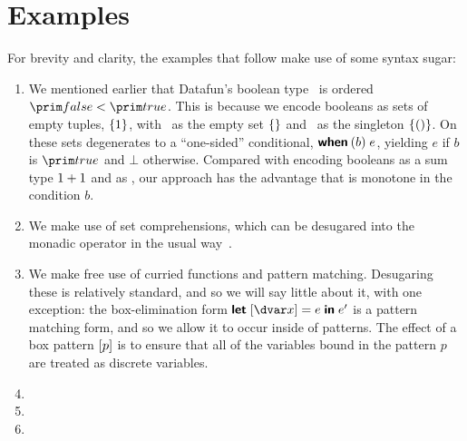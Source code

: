 \newcommand\notmember[2]{\neg \ebox{\mem \<\ebox{#1} \<{#2}}}
\renewcommand\notmember[2]{\ebox{#1} \not \in \ebox{#2}}

\section{Examples}
\label{examples}



For brevity and clarity, the examples that follow make use of some syntax sugar:

\begin{enumerate}

\item We mentioned earlier that Datafun's boolean type \tbool\ is ordered
  $\efalse < \etrue$. This is because we encode booleans as sets of empty
  tuples, $\{{1}\}$, with \efalse\ as the empty set $\{{}\}$ and
  \etrue\ as the singleton $\{{({})}\}$. On these sets 
  degenerates to a ``one-sided'' conditional, $\textsf{\bfseries when}\:({b})\; e$, yielding
  $e$ if $b$ is $\etrue$ and $\bot$ otherwise. Compared with encoding booleans
  as a sum type \(1 + 1\) and  as , our approach has
  the advantage that  is monotone in the condition $b$.


\item We make use of set comprehensions, which can be desugared into the monadic
  operator  in the usual way~\cite{wadler-monad-comprehensions}.

\item We make free use of curried functions and pattern matching. Desugaring
  these is relatively standard, and so we will say little about it, with one
  exception: the box-elimination form $\eletbox x e e'$ is a pattern matching
  form, and so we allow it to occur inside of patterns. The effect of a box
  pattern $[{p}]$ is to ensure that all of the variables bound in
  the pattern $p$ are treated as discrete variables.

\item {}

\item {}

\item {}
\end{enumerate}

